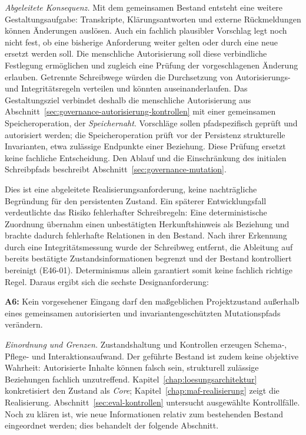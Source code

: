 \emph{Abgeleitete Konsequenz.} Mit dem gemeinsamen Bestand entsteht
eine weitere Gestaltungsaufgabe: Transkripte, Klärungsantworten und
externe Rückmeldungen können Änderungen auslösen. Auch ein fachlich
plausibler Vorschlag legt noch nicht fest, ob eine bisherige Anforderung
weiter gelten oder durch eine neue ersetzt werden soll. Die menschliche
Autorisierung soll diese verbindliche Festlegung ermöglichen und zugleich
eine Prüfung der vorgeschlagenen Änderung erlauben. Getrennte
Schreibwege würden die Durchsetzung von Autorisierungs- und
Integritätsregeln verteilen und könnten auseinanderlaufen.
Das Gestaltungsziel verbindet deshalb die menschliche Autorisierung
aus Abschnitt~\ref{sec:governance-autorisierung-kontrollen} mit einer
gemeinsamen Speicheroperation, der \emph{Speichernaht}. Vorschläge
sollen pfadspezifisch geprüft und autorisiert werden; die
Speicheroperation prüft vor der Persistenz strukturelle Invarianten,
etwa zulässige Endpunkte einer Beziehung. Diese Prüfung ersetzt
keine fachliche Entscheidung. Den Ablauf und die Einschränkung des
initialen Schreibpfads beschreibt Abschnitt~\ref{sec:governance-mutation}.

Dies ist eine abgeleitete Realisierungsanforderung, keine
nachträgliche Begründung für den persistenten Zustand. Ein späterer
Entwicklungsfall verdeutlichte das Risiko fehlerhafter Schreibregeln:
Eine deterministische Zuordnung übernahm einen unbestätigten
Herkunftshinweis als Beziehung und brachte dadurch fehlerhafte
Relationen in den Bestand. Nach ihrer Erkennung durch eine
Integritätsmessung wurde der Schreibweg entfernt, die Ableitung auf
bereits bestätigte Zustandsinformationen begrenzt und der Bestand
kontrolliert bereinigt (E46-01). Determinismus allein garantiert
somit keine fachlich richtige Regel. Daraus ergibt sich die sechste
Designanforderung:

\textbf{A6:} Kein vorgesehener Eingang darf den maßgeblichen
Projektzustand außerhalb eines gemeinsamen autorisierten und
invariantengeschützten Mutationspfads verändern.

\emph{Einordnung und Grenzen.} Zustandshaltung und Kontrollen
erzeugen Schema-, Pflege- und Interaktionsaufwand. Der geführte
Bestand ist zudem keine objektive Wahrheit: Autorisierte Inhalte
können falsch sein, strukturell zulässige Beziehungen fachlich
unzutreffend. Kapitel~\ref{chap:loesungsarchitektur} konkretisiert den
Zustand als \emph{Core}; Kapitel~\ref{chap:maf-realisierung} zeigt die
Realisierung. Abschnitt~\ref{sec:eval-kontrollen} untersucht ausgewählte
Kontrollfälle. Noch zu klären ist, wie neue Informationen relativ
zum bestehenden Bestand eingeordnet werden; dies behandelt der
folgende Abschnitt.
